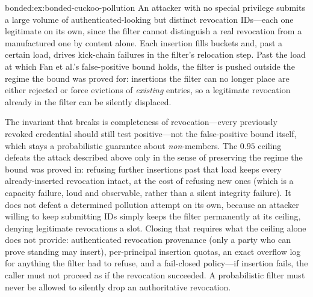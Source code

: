 \begin{pdSolution}{bonded:ex:bonded-cuckoo-pollution}
An attacker with no special privilege submits a large volume of authenticated-looking but distinct revocation IDs---each one legitimate on its own, since the filter cannot distinguish a real revocation from a manufactured one by content alone. Each insertion fills buckets and, past a certain load, drives kick-chain failures in the filter's relocation step. Past the load at which Fan et al.'s false-positive bound holds, the filter is pushed outside the regime the bound was proved for: insertions the filter can no longer place are either rejected or force evictions of \emph{existing} entries, so a legitimate revocation already in the filter can be silently displaced.

The invariant that breaks is completeness of revocation---every previously revoked credential should still test positive---not the false-positive bound itself, which stays a probabilistic guarantee about \emph{non}-members. The $0.95$ ceiling defeats the attack described above only in the sense of preserving the regime the bound was proved in: refusing further insertions past that load keeps every already-inserted revocation intact, at the cost of refusing new ones (which is a capacity failure, loud and observable, rather than a silent integrity failure). It does not defeat a determined pollution attempt on its own, because an attacker willing to keep submitting IDs simply keeps the filter permanently at its ceiling, denying legitimate revocations a slot. Closing that requires what the ceiling alone does not provide: authenticated revocation provenance (only a party who can prove standing may insert), per-principal insertion quotas, an exact overflow log for anything the filter had to refuse, and a fail-closed policy---if insertion fails, the caller must not proceed as if the revocation succeeded. A probabilistic filter must never be allowed to silently drop an authoritative revocation.
\end{pdSolution}

